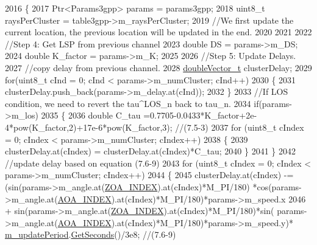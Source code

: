 \begin{DoxyCode}
2016 \{
2017         Ptr<Params3gpp> params = params3gpp;
2018         uint8\_t raysPerCluster = table3gpp->m\_raysPerCluster;
2019         \textcolor{comment}{//We first update the current location, the previous location will be updated in the end.}
2020 
2021 
2022         \textcolor{comment}{//Step 4: Get LSP from previous channel}
2023         \textcolor{keywordtype}{double} DS = params->m\_DS;
2024         \textcolor{keywordtype}{double} K\_factor = params->m\_K;
2025 
2026         \textcolor{comment}{//Step 5: Update Delays.}
2027         \textcolor{comment}{//copy delay from previous channel.}
2028         \hyperlink{namespacens3_aa6f1edf6566ca6afec613bc6e40240ea}{doubleVector\_t} clusterDelay;
2029         \textcolor{keywordflow}{for}(uint8\_t cInd = 0; cInd < params->m\_numCluster; cInd++)
2030         \{
2031                 clusterDelay.push\_back(params->m\_delay.at(cInd));
2032         \}
2033         \textcolor{comment}{//If LOS condition, we need to revert the tau^LOS\_n back to tau\_n.}
2034         \textcolor{keywordflow}{if}(params->m\_los)
2035         \{
2036                 \textcolor{keywordtype}{double} C\_tau =0.7705-0.0433*K\_factor+2e-4*pow(K\_factor,2)+17e-6*pow(K\_factor,3); \textcolor{comment}{//(7.5-3)}
2037                 \textcolor{keywordflow}{for} (uint8\_t cIndex = 0; cIndex < params->m\_numCluster; cIndex++)
2038                 \{
2039                         clusterDelay.at(cIndex) = clusterDelay.at(cIndex)*C\_tau;
2040                 \}
2041         \}
2042         \textcolor{comment}{//update delay based on equation (7.6-9)}
2043         \textcolor{keywordflow}{for} (uint8\_t cIndex = 0; cIndex < params->m\_numCluster; cIndex++)
2044         \{
2045                 clusterDelay.at(cIndex) -= (sin(params->m\_angle.at(\hyperlink{mmwave-3gpp-channel_8h_a86ab9a21bb66f50f7f4b0c0a0ee1f474}{ZOA\_INDEX}).at(cIndex)*M\_PI/180)
      *cos(params->m\_angle.at(\hyperlink{mmwave-3gpp-channel_8h_a7f1d5772b72f2ce425d85a2b41e8842f}{AOA\_INDEX}).at(cIndex)*M\_PI/180)*params->m\_speed.x
2046                                 + sin(params->m\_angle.at(\hyperlink{mmwave-3gpp-channel_8h_a86ab9a21bb66f50f7f4b0c0a0ee1f474}{ZOA\_INDEX}).at(cIndex)*M\_PI/180)*sin(
      params->m\_angle.at(\hyperlink{mmwave-3gpp-channel_8h_a7f1d5772b72f2ce425d85a2b41e8842f}{AOA\_INDEX}).at(cIndex)*M\_PI/180)*params->m\_speed.y)*
      \hyperlink{classns3_1_1MmWave3gppChannel_a2844f8c7e7373cb777384eaf0e8a7b11}{m\_updatePeriod}.\hyperlink{classns3_1_1Time_a8f20d5c3b0902d7b4320982f340b57c8}{GetSeconds}()/3e8;     \textcolor{comment}{//(7.6-9)}

\end{DoxyCode}

